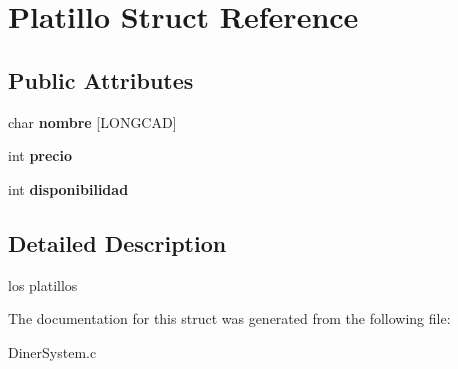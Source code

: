\hypertarget{struct_platillo}{}\section{Platillo Struct Reference}
\label{struct_platillo}
\subsection*{Public Attributes}
\begin{DoxyCompactItemize}
\item 
\mbox{\label{struct_platillo_a20b3fab702f4065a22eeb5d12c5ffddf}} 
char {\bfseries nombre} \mbox{[}L\+O\+N\+G\+C\+AD\mbox{]}
\item 
\mbox{\label{struct_platillo_a83b1b5ae3079212f1f55b00acd2718fd}} 
int {\bfseries precio}
\item 
\mbox{\label{struct_platillo_ae593c9b98c820b4d166d98d7f9523b56}} 
int {\bfseries disponibilidad}
\end{DoxyCompactItemize}


\subsection{Detailed Description}
los platillos 

The documentation for this struct was generated from the following file\+:\begin{DoxyCompactItemize}
\item 
Diner\+System.\+c\end{DoxyCompactItemize}
